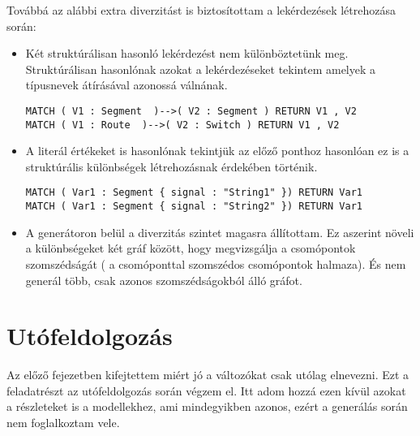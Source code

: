 Továbbá az alábbi extra diverzitást is biztosítottam a lekérdezések létrehozása során:
\begin{itemize}
	\item Két struktúrálisan hasonló lekérdezést nem különböztetünk meg. Struktúrálisan hasonlónak azokat a lekérdezéseket tekintem amelyek a típusnevek átírásával azonossá válnának.
\begin{lstlisting}[style=cyphersmall]
MATCH ( V1 : Segment  )-->( V2 : Segment ) RETURN V1 , V2
MATCH ( V1 : Route  )-->( V2 : Switch ) RETURN V1 , V2
\end{lstlisting}
	\item A literál értékeket is hasonlónak tekintjük az előző ponthoz hasonlóan ez is a struktúrális különbségek létrehozásnak érdekében történik. 
\begin{lstlisting}[style=cyphersmall]
MATCH ( Var1 : Segment { signal : "String1" }) RETURN Var1
MATCH ( Var1 : Segment { signal : "String2" }) RETURN Var1
\end{lstlisting}
	\item A generátoron belül a diverzitás szintet magasra állítottam. Ez aszerint növeli a különbségeket két gráf között, hogy megvizsgálja a csomópontok szomszédságát ( a csomóponttal szomszédos csomópontok halmaza). És nem generál több, csak azonos szomszédságokból álló gráfot.  
\end{itemize}


\section{Utófeldolgozás}
Az előző fejezetben kifejtettem miért jó  a változókat csak utólag elnevezni. Ezt a feladatrészt az utófeldolgozás során végzem el. Itt adom hozzá ezen kívül azokat a részleteket is a modellekhez, ami mindegyikben azonos, ezért a generálás során nem foglalkoztam vele. 

